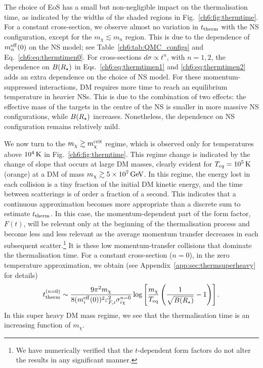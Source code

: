 The choice of EoS has a small but non-negligible impact on the thermalisation time, as indicated by the widths of the shaded regions in Fig.~\ref{ch6:fig:thermtime}. 
For a constant cross-section, we observe almost no variation in $t_{\rm therm}$ with the NS configuration, except for the $m_\chi \lesssim m_n$ region. This is due to the dependence of $m_n^{\rm eff}(0)$ on the NS model; see Table~\ref{ch6:tab:QMC_configs} and Eq.~\ref{ch6:eq:thermtimen0}.
For cross-sections $d\sigma\propto t^n$, with $n=1,2$, the dependence on $B(R_\star)$ in Eqs.~\ref{ch6:eq:thermtimen1} and \ref{ch6:eq:thermtimen2} adds an extra dependence on the choice of NS model. For these momentum-suppressed interactions, DM requires more time to reach an equilibrium temperature in heavier NSs. This is due to the combination of two effects: the effective mass of the targets in the centre of the NS is smaller in more massive NS configurations, while $B(R_\star)$ increases. Nonetheless, the dependence on NS configuration remains relatively mild. 




We now turn to the $m_\chi \gtrsim m_\chi^{\rm crit}$ regime, which is observed only for temperatures above $10^4{\rm \,K}$ in Fig.~\ref{ch6:fig:thermtime}. This regime change is indicated by the change of slope that occurs at large DM masses, clearly evident for  $T_{eq}=10^5{\rm \,K}$ (orange)  at a DM of mass $m_\chi\gtrsim5\times10^7{\rm \,GeV}$.  
In this regime, the energy lost in each collision is a tiny fraction of the initial DM kinetic energy, and the time between scatterings is of order a fraction of a second. This indicates that a continuous approximation becomes more appropriate than a discrete sum to estimate $t_{\rm therm}$.
In this case, the momentum-dependent part of the form factor, $F(t)$, will be relevant only at the beginning of the thermalisation process and become less and less relevant as the average momentum transfer decreases in each subsequent scatter.\footnote{We have numerically verified that the $t$-dependent form factors do not alter the results in any significant manner.} It is these low momentum-transfer collisions that dominate the thermalisation time.
%
For a constant cross-section ($n=0$), in the zero temperature approximation, we obtain 
(see Appendix~\ref{app:sec:thermsuperheavy} for details)
\begin{equation}
    \tthn{0} \sim \frac{9 \pi^2 m_\chi}{8 (\mbeff(0))^2 \kinFi^2 \sigma_{i\chi}^{n=0} }\log\left[\frac{m_\chi}{T_{\rm eq}}\left(\frac{1}{\sqrt{B(\Rstar)}}-1\right)\right]. %
\label{ch6:eq:tthemheavy0text}
\end{equation}
In this super heavy DM mass regime, we see that the thermalisation time is an increasing function of $m_\chi$. 


